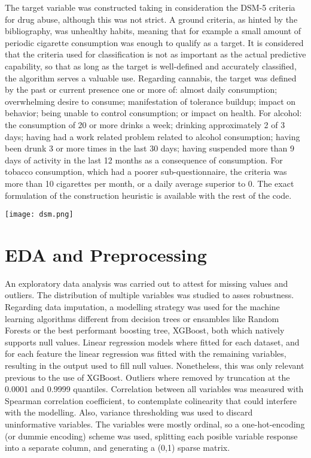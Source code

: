 \documentclass[8pt]{article}
\begin{document}
{\begin{multicols}{2}
The target variable was constructed taking in consideration the DSM-5 criteria for drug abuse, although this was not strict. A ground criteria, as hinted by the bibliography, was unhealthy habits, meaning that for example a small amount of periodic cigarette consumption was enough to qualify as a target. It is considered that the criteria used for classification is not as important as the actual predictive capability, so that as long as the target is well-defined and accurately classified, the algorithm serves a valuable use. Regarding cannabis, the target was defined by the past or current presence one or more of: almost daily consumption; overwhelming desire to consume; manifestation of tolerance buildup; impact on behavior; being unable to control consumption; or impact on health. For alcohol: the consumption of 20 or more drinks a week; drinking approximately 2 of 3 days; having had a work related problem related to alcohol consumption; having been drunk 3 or more times in the last 30 days; having suspended more than 9 days of activity in the last 12 months as a consequence of consumption. For tobacco consumption, which had a poorer sub-questionnaire, the criteria was more than 10 cigarettes per month, or a daily average superior to 0. The exact formulation of the construction heuristic is available with the rest of the code. 
\begin{center}
	\captionsetup[figure]{labelformat=empty, font=small}
	\texttt{[image: dsm.png]}
	\captionsetup[figure]{labelformat=empty, font=small}
\end{center}

\section{EDA and Preprocessing}

An exploratory data analysis was carried out to attest for missing values and outliers. The distribution of multiple variables was studied to asses robustness. Regarding data imputation, a modelling strategy was used for the machine learning algorithms different from decision trees or ensambles like Random Forests or the best performant boosting tree, XGBoost, both which natively supports null values. Linear regression models where fitted for each dataset, and for each feature the linear regression was fitted with the remaining variables, resulting in the output used to fill null values. Nonetheless, this was only relevant previous to the use of XGBoost. Outliers where removed by truncation at the 0.0001 and 0.9999 quantiles. Correlation between all variables was measured with Spearman correlation coefficient, to contemplate colinearity that could interfere with the modelling. Also, variance thresholding was used to discard uninformative variables. The variables were mostly ordinal, so a one-hot-encoding (or dummie encoding) scheme was used, splitting each posible variable response into a separate column, and generating a (0,1) sparse matrix.


\end{multicols}}
\end{document}
